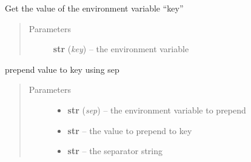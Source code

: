 \documentclass[a4paper,10pt,english]{sphinxmanual}
\begin{document}
\begin{fulllineitems}
\begin{fulllineitems}
\begin{quote}
\begin{description}
\end{description}\end{quote}

\end{fulllineitems}


\begin{fulllineitems}
\label{commands/apidoc/src:src.fileEnviron.ContextFileEnviron.get}
Get the value of the environment variable ``key''
\begin{quote}\begin{description}
\item[{Parameters}] \leavevmode
\textbf{str} (\emph{key}) -- the environment variable

\end{description}\end{quote}

\end{fulllineitems}


\begin{fulllineitems}
\label{commands/apidoc/src:src.fileEnviron.ContextFileEnviron.prepend_value}
prepend value to key using sep
\begin{quote}\begin{description}
\item[{Parameters}] \leavevmode\begin{itemize}
\item {} 
\textbf{str} (\emph{sep}) -- the environment variable to prepend

\item {} 
\textbf{str} -- the value to prepend to key

\item {} 
\textbf{str} -- the separator string

\end{itemize}

\end{description}\end{quote}

\end{fulllineitems}



\end{fulllineitems}
\end{document}
